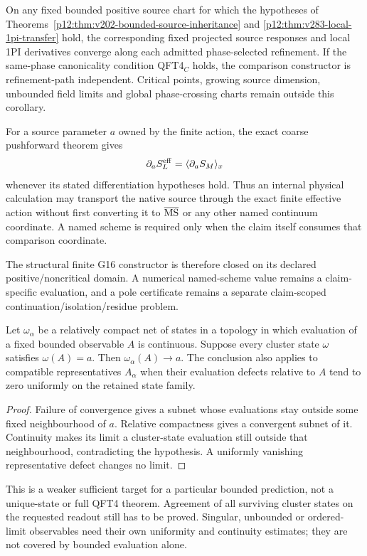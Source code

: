 \documentclass[12pt,a4paper]{article}
\begin{document}
\begin{corollary}
\label{p12:cor:v2123-g16-controlled-limit}
On any fixed bounded positive source chart for which the hypotheses of
Theorems~\ref{p12:thm:v202-bounded-source-inheritance} and
\ref{p12:thm:v283-local-1pi-transfer} hold, the corresponding fixed projected
source responses and local 1PI derivatives converge along each admitted
phase-selected refinement.  If the same-phase canonicality condition QFT4$_C$
holds, the comparison constructor is refinement-path independent.  Critical
points, growing source dimension, unbounded field limits and global
phase-crossing charts remain outside this corollary.
\end{corollary}

\begin{corollary}
\label{p12:cor:v2123-native-source-blocking}
For a source parameter $a$ owned by the finite action, the exact coarse
pushforward theorem gives
\[
 \partial_aS_L^{\rm eff}=\langle\partial_aS_M\rangle_x
\]
whenever its stated differentiation hypotheses hold.  Thus an internal
physical calculation may transport the native source through the exact finite
effective action without first converting it to $\overline{\rm MS}$ or any
other named continuum coordinate.  A named scheme is required only when the
claim itself consumes that comparison coordinate.
\end{corollary}

The structural finite G16 constructor is therefore closed on its declared
positive/noncritical domain.  A numerical named-scheme value remains a
claim-specific evaluation, and a pole certificate remains a separate
claim-scoped continuation/isolation/residue problem.

\begin{theorem}
\label{p12:thm:v2109-observable-cluster-convergence}
Let \(\omega_\alpha\) be a relatively compact net of states in a topology
in which evaluation of a fixed bounded observable \(A\) is continuous.
Suppose every cluster state \(\omega\) satisfies \(\omega(A)=a\).
Then \(\omega_\alpha(A)\to a\).  The conclusion also applies to
compatible representatives \(A_\alpha\) when their evaluation defects
relative to \(A\) tend to zero uniformly on the retained state family.
\end{theorem}
\begin{proof}
Failure of convergence gives a subnet whose evaluations stay outside some
fixed neighbourhood of \(a\).  Relative compactness gives a convergent
subnet of it.  Continuity makes its limit a cluster-state evaluation still
outside that neighbourhood, contradicting the hypothesis.  A uniformly
vanishing representative defect changes no limit.
\end{proof}
This is a weaker sufficient target for a particular bounded prediction,
not a unique-state or full QFT4 theorem.  Agreement of all surviving cluster
states on the requested readout still has to be proved.  Singular,
unbounded or ordered-limit observables need their own uniformity and
continuity estimates; they are not covered by bounded evaluation alone.
\end{document}
